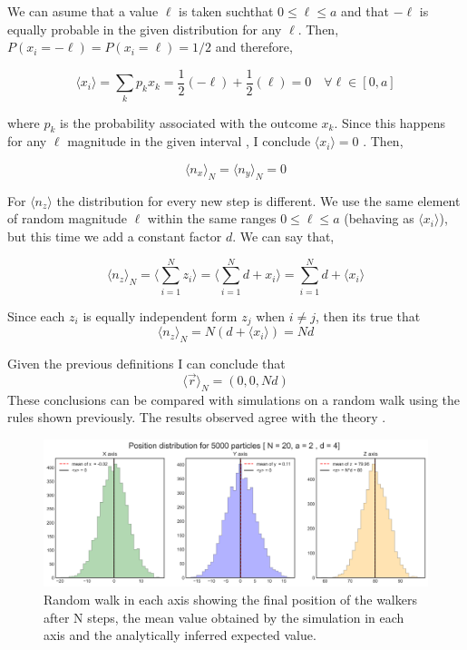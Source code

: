 \documentclass{article}
\begin{document}
We can asume that a value $\ell$ is taken suchthat $0 \leq \ell \leq a$ and that $- \ell$ is equally probable in the given distribution for any $\ell$. Then, $P(x_i = -\ell) = P(x_i = \ell) = 1/2$ and therefore,

\begin{equation}
    \langle x_i \rangle = \sum_{k} p_k x_k = \frac{1}{2}(-\ell) + \frac{1}{2}(\ell) = 0 \quad \forall \ell \in [0,a]
\end{equation}

where $p_k$ is the probability associated with the outcome $x_k$. Since this happens for any $\ell$ magnitude in the given interval , I conclude $\langle x_i \rangle = 0$ . Then,

\begin{equation}
     \langle n_x \rangle_N = \langle n_y \rangle_N = 0
\end{equation}

For $\langle n_z\rangle$ the distribution for every new step is different. We use the same element of random magnitude $\ell$ within the same ranges $0 \leq \ell \leq a$ (behaving as $\langle x_i \rangle$), but this time we add a constant factor $d$. We can say that,

\begin{equation}
   \langle n_z \rangle_N =\langle \sum_{i=1}^N z_i \rangle = \langle \sum_{i=1}^N   d + x_i \rangle = \sum_{i=1}^N d + \langle x_i \rangle
\end{equation}

Since each $z_i$ is equally independent form $z_j$ when $i \neq j$, then its true that
\begin{equation}
    \langle n_z \rangle_N = N \left( d + \langle x_i \rangle \right) = Nd
\end{equation}


Given the previous definitions I can conclude that
\begin{equation}
\langle \vec{r} \rangle_N = (0,0,Nd)   
\end{equation}
These conclusions can be compared with simulations on a random walk using the rules shown previously. The results observed agree with the theory .

\begin{figure}[h]
\centering
\includegraphics[width=1\textwidth]{imgs/pos_randomwalk.png}
\caption{Random walk in each axis showing the final position of the walkers after N steps, the mean value obtained by the simulation in each axis and the analytically inferred expected value.}
\end{figure}
\end{document}
